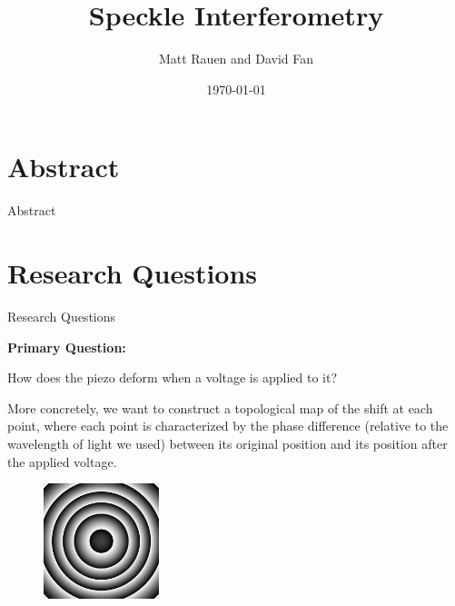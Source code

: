 \documentclass[pdf]{beamer}
\title{Speckle Interferometry}
\author{Matt Rauen and David Fan}
\date{\today}
\begin{document}
\begin{frame}
\titlepage
\end{frame}

\section{Abstract}
\begin{frame}{Abstract}

\end{frame}

\section{Research Questions}
\begin{frame}{Research Questions}
\begin{center}
{\bf Primary Question:}

How does the piezo deform when a voltage is applied to it?
\end{center}
More concretely, we want to construct a topological map of the shift at each point, where each point is characterized by the phase difference (relative to the wavelength of light we used) between its original position and its position after the applied voltage.
\begin{figure}[htbp]
\centering
\includegraphics[width=0.3\textwidth]{gaussian_bump.png}
\end{figure}
\end{frame}
\end{document}
